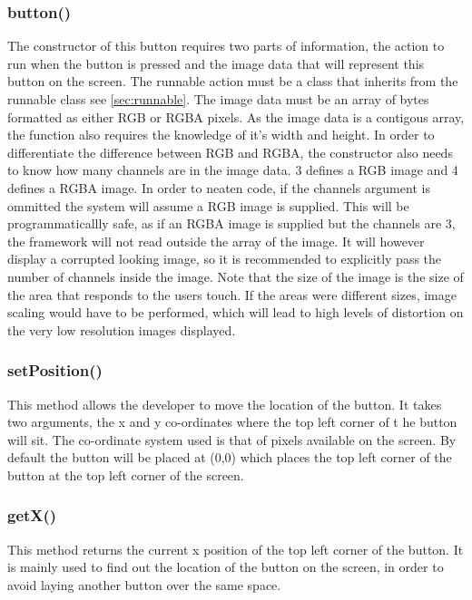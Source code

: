 \subsubsection{button()}

The constructor of this button requires two parts of information, the action to run when the button is pressed and the image data that will represent this button on the screen. The runnable action must be a class that inherits from the runnable class see \ref{sec:runnable}. The image data must be an array of bytes formatted as either RGB or RGBA pixels. As the image data is a contigous array, the function also requires the knowledge of it's width and height. In order to differentiate the difference between RGB and RGBA, the constructor also needs to know how many channels are in  the image data. 3 defines a RGB image and 4 defines a RGBA image. In order to neaten code, if the channels argument is ommitted the system will assume a RGB image is supplied. This will be programmaticallly safe, as if an RGBA image is supplied but the channels are 3, the framework will not read outside the array of the image. It will however display a corrupted looking image, so it is recommended to explicitly pass the number of channels inside the image. 
Note that the size of the image is the size of the area that responds to the users touch. If the areas were different sizes, image scaling would have to be performed, which will lead to high levels of distortion on the very low resolution images displayed.

\subsubsection{setPosition()}

This method allows the developer to move the location of the button. It takes two arguments, the x and y co-ordinates where the top left corner of t he button will sit. The co-ordinate system used is that of pixels available on the screen. By default the button will be placed at (0,0) which places the top left corner of the button at the top left corner of the screen.

\subsubsection{getX()}

This method returns the current x position of the top left corner of the button. It is mainly used to find out the location of the button on the screen, in order to avoid laying another button over the same space.


